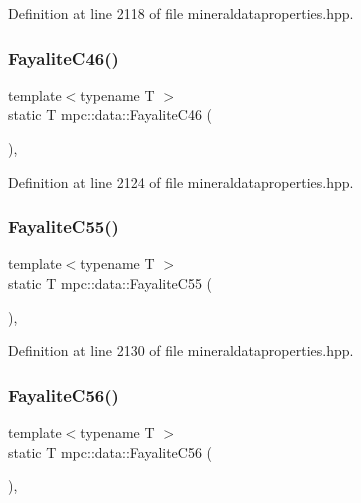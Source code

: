 Definition at line 2118 of file mineraldataproperties.\+hpp.

\mbox{\label{namespacempc_1_1data_ad06ef2357b45feebb7aac4b81443cb6e}} 
\subsubsection{\texorpdfstring{Fayalite\+C46()}{FayaliteC46()}}
{\footnotesize\ttfamily template$<$typename T $>$ \\
static T mpc\+::data\+::\+Fayalite\+C46 (\begin{DoxyParamCaption}{ }\end{DoxyParamCaption})\hspace{0.3cm}{\ttfamily [inline]}, {\ttfamily [static]}}



Definition at line 2124 of file mineraldataproperties.\+hpp.

\mbox{\label{namespacempc_1_1data_a26a98cb1967f16732ac483590165ad24}} 
\subsubsection{\texorpdfstring{Fayalite\+C55()}{FayaliteC55()}}
{\footnotesize\ttfamily template$<$typename T $>$ \\
static T mpc\+::data\+::\+Fayalite\+C55 (\begin{DoxyParamCaption}{ }\end{DoxyParamCaption})\hspace{0.3cm}{\ttfamily [inline]}, {\ttfamily [static]}}



Definition at line 2130 of file mineraldataproperties.\+hpp.

\mbox{\label{namespacempc_1_1data_abd1d44067a331c80523e07355371c8bd}} 
\subsubsection{\texorpdfstring{Fayalite\+C56()}{FayaliteC56()}}
{\footnotesize\ttfamily template$<$typename T $>$ \\
static T mpc\+::data\+::\+Fayalite\+C56 (\begin{DoxyParamCaption}{ }\end{DoxyParamCaption})\hspace{0.3cm}{\ttfamily [inline]}, {\ttfamily [static]}}



